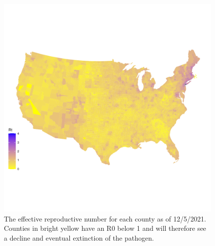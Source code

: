 \documentclass[
  12pt,
]{article}
\begin{document}
\begin{figure}[H]

{\centering \includegraphics{Final-Manuscript_files/figure-latex/fig5-1} 

}

\caption{The effective reproductive number for each county as of 12/5/2021. Counties in bright yellow have an R0 below 1 and will therefore see a decline and eventual extinction of the pathogen.}\label{fig:fig5}
\end{figure}
\end{document}
